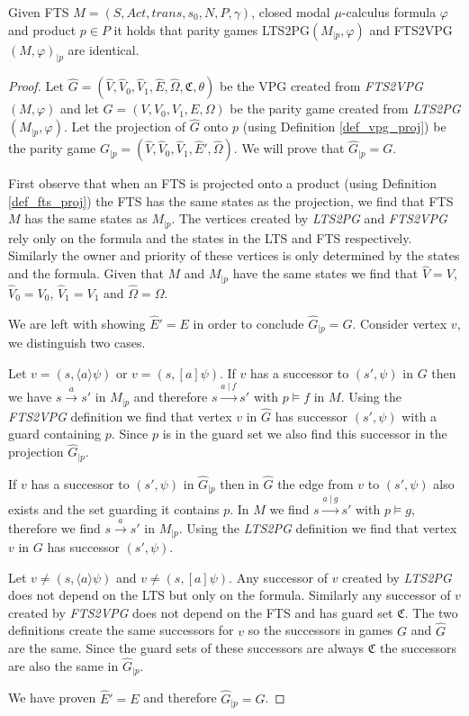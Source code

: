 \begin{lemma}
	\label{lem_VPG_proj_is_FTS_proj}
	Given FTS $M = (S, Act, trans, s_0, N, P, \gamma)$, closed modal $\mu$-calculus formula $\varphi$ and product $p \in P$ it holds that parity games LTS2PG$(M_{|p}, \varphi)$ and FTS2VPG$(M, \varphi)_{|p}$ are identical.
	\begin{proof}
		Let $\hat{G} = (\hat{V},\hat{V}_0,\hat{V}_1,\hat{E},\hat{\Omega},\mathfrak{C},\theta)$ be the VPG created from \textit{FTS2VPG}$(M,\varphi)$ and let $G = (V,V_0,V_1,E,\Omega)$ be the parity game created from \textit{LTS2PG}$(M_{|p},\varphi)$. Let the projection of $\hat{G}$ onto $p$ (using Definition \ref{def_vpg_proj}) be the parity game $G_{|p} = (\hat{V},\hat{V}_0,\hat{V}_1,\hat{E}',\hat{\Omega})$. We will prove that $\hat{G}_{|p} = G$.
		
		First observe that when an FTS is projected onto a product (using Definition \ref{def_fts_proj}) the FTS has the same states as the projection, we find that FTS $M$ has the same states as $M_{|p}$. The vertices created by \textit{LTS2PG} and \textit{FTS2VPG} rely only on the formula and the states in the LTS and FTS respectively. Similarly the owner and priority of these vertices is only determined by the states and the formula. Given that $M$ and $M_{|p}$ have the same states we find that $\hat{V} = V$, $\hat{V}_0 = V_0$, $\hat{V}_1 = V_1$ and $\hat{\Omega} = \Omega$.
		
		We are left with showing $\hat{E}' = E$ in order to conclude $\hat{G}_{|p} = G$. Consider vertex $v$, we distinguish two cases. 
		
		Let $v = (s,\langle a \rangle \psi)$ or $v = (s,[a] \psi)$. If $v$ has a successor to $(s',\psi)$ in $G$ then we have $s \xrightarrow{a} s'$ in $M_{|p}$ and therefore $s \xrightarrow{a\ |\ f} s'$ with $p \models f$ in $M$. Using the \textit{FTS2VPG} definition we find that vertex $v$ in $\hat{G}$ has successor $(s',\psi)$ with a guard containing $p$. Since $p$ is in the guard set we also find this successor in the projection $\hat{G}_{|p}$. 
		
		If $v$ has a successor to $(s',\psi)$ in $\hat{G}_{|p}$ then in $\hat{G}$ the edge from $v$ to $(s',\psi)$ also exists and the set guarding it contains $p$. In $M$ we find $s \xrightarrow{a\ |\ g} s'$ with $p \models g$, therefore we find $s \xrightarrow{a} s'$ in $M_{|p}$. Using the \textit{LTS2PG} definition we find that vertex $v$ in $G$ has successor $(s',\psi)$.
		
		Let $v \neq (s,\langle a \rangle \psi)$ and $v \neq (s,[a]\psi)$. Any successor of $v$ created by \textit{LTS2PG} does not depend on the LTS but only on the formula. Similarly any successor of $v$ created by \textit{FTS2VPG} does not depend on the FTS and has guard set $\mathfrak{C}$. The two definitions create the same successors for $v$ so the successors in games $G$ and $\hat{G}$ are the same. Since the guard sets of these successors are always $\mathfrak{C}$ the successors are also the same in $\hat{G}_{|p}$.
		
		We have proven $\hat{E}' = E$ and therefore $\hat{G}_{|p} = G$.
	\end{proof}
\end{lemma}
